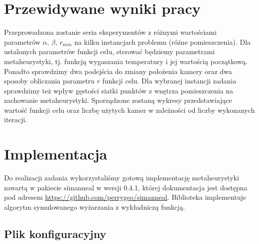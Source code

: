 \documentclass[12pt,a4paper]{article}
\begin{document}
\section{Przewidywane wyniki pracy}
Przeprowadzona zostanie seria eksperymentów z różnymi wartościami parametrów $\alpha$, $\beta$, $r_{min}$ na kilku instancjach problemu (różne pomieszczenia). Dla ustalonych parametrów funkcji celu, sterować będziemy parametrami metaheurystyki, tj. funkcją wygaszania temperatury i jej
wartością początkową. Ponadto sprawdzimy dwa podejścia do zmiany położenia kamery oraz dwa sposoby obliczania parametru $r$ funkcji celu. Dla wybranej
instancji zadania sprawdzimy też wpływ gęstości siatki punktów z wnętrza
pomieszczenia na zachowanie metaheurystyki. Sporządzone zostaną wykresy przedstawiające wartość funkcji celu oraz liczbę użytych kamer w zależności od liczby wykonanych iteracji. 

\section{Implementacja}
Do realizacji zadania wykorzystaliśmy gotową implementację metaheurystyki zawartą w pakiecie simanneal w wersji 0.4.1,
której dokumentacja jest dostępna pod adresem \url{https://github.com/perrygeo/simanneal}.
Biblioteka implementuje algorytm symulowanego wyżarzania z wykładniczą funkcją.

\subsection{Plik konfiguracyjny}
\end{document}
